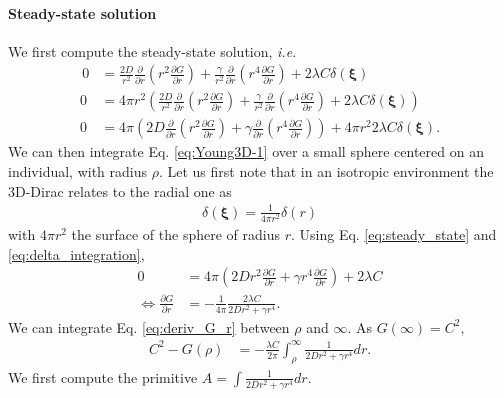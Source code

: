 \documentclass[12pt,english]{article}
\begin{document}
\paragraph*{Steady-state solution}

We first compute the steady-state solution,\textit{ i.e.} 
\begin{align}
\,0 & =\frac{2D}{r^{2}}\frac{\partial}{\partial r}\left(r^{2}\frac{\partial G}{\partial r}\right)+\frac{\gamma}{r^{2}}\frac{\partial}{\partial r}\left(r^{4}\frac{\partial G}{\partial r}\right)+2\lambda C\delta(\boldsymbol{\xi})\nonumber \\
0 & =4\pi r^{2}\left(\frac{2D}{r^{2}}\frac{\partial}{\partial r}\left(r^{2}\frac{\partial G}{\partial r}\right)+\frac{\gamma}{r^{2}}\frac{\partial}{\partial r}\left(r^{4}\frac{\partial G}{\partial r}\right)+2\lambda C\delta(\boldsymbol{\boldsymbol{\xi}})\right)\nonumber \\
0 & =4\pi\left(2D\frac{\partial}{\partial r}\left(r^{2}\frac{\partial G}{\partial r}\right)+\gamma\frac{\partial}{\partial r}\left(r^{4}\frac{\partial G}{\partial r}\right)\right)+4\pi r^{2}2\lambda C\delta(\boldsymbol{\boldsymbol{\xi}}).\label{eq:steady_state}
\end{align}
We can then integrate Eq. \ref{eq:Young3D-1} over a small sphere
centered on an individual, with radius $\rho$. Let us first note
that in an isotropic environment the 3D-Dirac relates to the radial one as
\begin{align}
 \delta(\boldsymbol{\xi}) =  \frac{1}{4 \pi r^2}\delta(r) \label{eq:delta_integration}%
\end{align}
with $4\pi r^2$ the surface of the sphere of radius $r$.
Using Eq. \ref{eq:steady_state} and \ref{eq:delta_integration},
\begin{align}
0 & =4\pi\left(2Dr^{2}\frac{\partial G}{\partial r}+\gamma r^{4}\frac{\partial G}{\partial r}\right)+2\lambda C\nonumber \\
\Leftrightarrow\frac{\partial G}{\partial r} & =-\frac{1}{4\pi}\frac{2\lambda C}{2Dr^{2}+\gamma r^{4}}.\label{eq:deriv_G_r}
\end{align}
We can integrate Eq. \ref{eq:deriv_G_r} between $\rho$ and $\infty$.
As $G(\infty)=C^{2},$ 
\begin{align}
C^{2}-G(\rho) & =-\frac{\lambda C}{2\pi}{\displaystyle \int_{\rho}^{\infty}}\frac{1}{2Dr^{2}+\gamma r^{4}}dr.\label{eq:deriv_G_r_int1}
\end{align}
We first compute the primitive $A=\int\frac{1}{2Dr^{2}+\gamma r^{4}}dr$.
\end{document}
